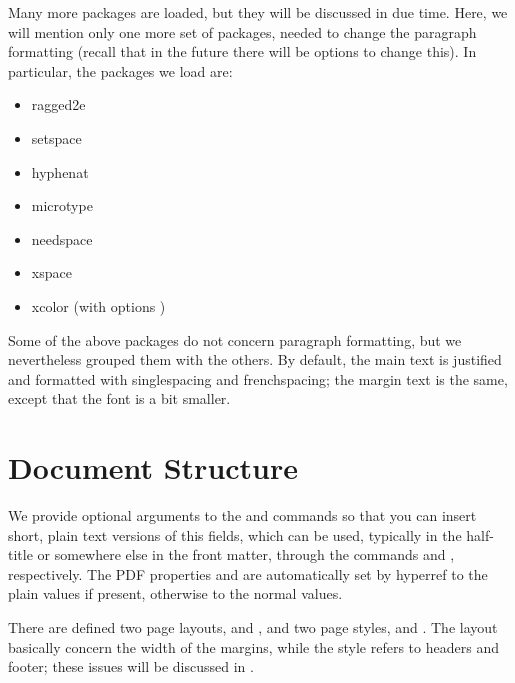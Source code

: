 Many more packages are loaded, but they will be discussed in due time.
Here, we will mention only one more set of packages, needed to change
the paragraph formatting (recall that in the future there will be
options to change this). In particular, the packages we load are:

\begin{itemize}
	\item ragged2e
	\item setspace
	\item hyphenat
	\item microtype
	\item needspace
	\item xspace
	\item xcolor (with options )
\end{itemize}

Some of the above packages do not concern paragraph formatting, but we
nevertheless grouped them with the others. By default, the main text is
justified and formatted with singlespacing and frenchspacing; the margin
text is the same, except that the font is a bit smaller.

\section{Document Structure}

We provide optional arguments to the  and
 commands so that you can insert short, plain text
versions of this fields, which can be used, typically in the half-title
or somewhere else in the front matter, through the commands
 and , respectively. The PDF
properties  and  are automatically
set by hyperref to the plain values if present, otherwise to the normal
values.

There are defined two page layouts,  and ,
and two page styles,  and . The layout
basically concern the width of the margins, while the style refers to
headers and footer; these issues will be
discussed in .

